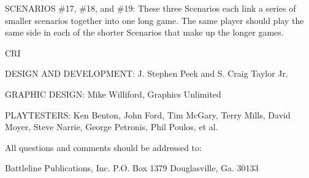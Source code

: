 SCENARIOS \#17, \#18, and \#19: These three Scenarios each link a series of smaller scenarios together into one long game. The same player should play the same side in each of the shorter Scenarios that make up the longer games.

CRI

DESIGN AND DEVELOPMENT: J. Stephen Peek and S. Craig Taylor Jr.

GRAPHIC DESIGN: Mike Williford, Graphics Unlimited

PLAYTESTERS: Ken Benton, John Ford, Tim McGary, Terry Mills, David Moyer, Steve Narrie, George Petronis, Phil Poulos, et al.

All questions and comments should be addressed to:

Battleline Publications, Inc. P.O. Box 1379 Douglasville, Ga. 30133

